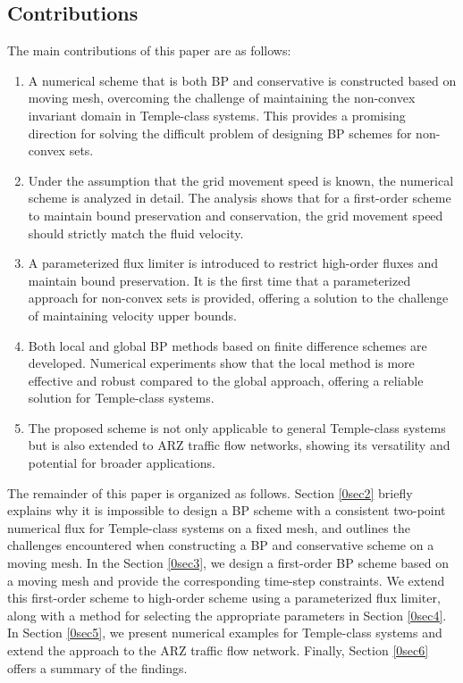 \documentclass[times,final,11pt]{elsarticle}
\numberwithin{equation}{section}
\theoremstyle{definition}
\theoremstyle{remark}
\begin{document}
\subsection{Contributions}

The main contributions of this paper are as follows:
\begin{enumerate}[leftmargin=8mm]
	\item[1)] A numerical scheme that is both BP and conservative is constructed based on moving mesh, overcoming the challenge of maintaining the non-convex invariant domain in Temple-class systems. This provides a promising direction for solving the difficult problem of designing BP schemes for non-convex sets.

	\item[2)] Under the assumption that the grid movement speed is known, the numerical scheme is analyzed in detail. The analysis shows that for a first-order scheme to maintain bound preservation and conservation, the grid movement speed should strictly match the fluid velocity.

	\item[3)] A parameterized flux limiter is introduced to restrict high-order fluxes and maintain bound preservation. It is the first time that a parameterized approach for non-convex sets is provided, offering a solution to the challenge of maintaining velocity upper bounds.
	
	\item[4)] Both local and global BP methods based on finite difference schemes are developed. Numerical experiments show that the local method is more effective and robust compared to the global approach, offering a reliable solution for Temple-class systems.

	\item[5)] The proposed scheme is not only applicable to general Temple-class systems but is also extended to ARZ traffic flow networks, showing its versatility and potential for broader applications.
\end{enumerate}

The remainder of this paper is organized as follows. Section \ref{0sec2} briefly explains why it is impossible to design a BP scheme with a consistent two-point numerical flux for Temple-class systems on a fixed mesh, and outlines the challenges encountered when constructing a BP and conservative scheme on a moving mesh. In the Section \ref{0sec3}, we design a first-order BP scheme based on a moving mesh and provide the corresponding time-step constraints. We extend this first-order scheme to high-order scheme using a parameterized flux limiter, along with a method for selecting the appropriate parameters in Section \ref{0sec4}. In Section \ref{0sec5}, we present numerical examples for Temple-class systems and extend the approach to the ARZ traffic flow network. Finally, Section \ref{0sec6} offers a summary of the findings.
\end{document}
